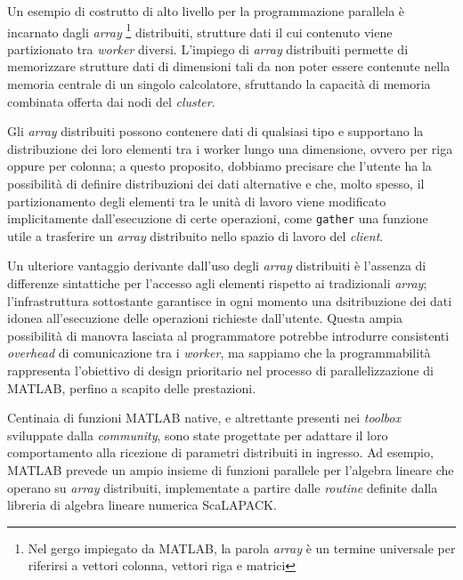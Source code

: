 Un esempio di costrutto di alto livello per la programmazione parallela \`e incarnato dagli \textit{array}
\footnote{Nel gergo impiegato da MATLAB, la parola \textit{array} \`e un termine universale per riferirsi a vettori colonna, vettori riga e matrici} 
distribuiti, strutture dati il cui contenuto viene partizionato tra \textit{worker} diversi.\newline
L'impiego di \textit{array} distribuiti permette di memorizzare strutture dati di dimensioni tali da non poter essere contenute nella memoria centrale di un 
singolo calcolatore, sfruttando la capacit\`a di memoria combinata offerta dai nodi del \textit{cluster}.

Gli \textit{array} distribuiti possono contenere dati di qualsiasi tipo e supportano la distribuzione dei loro elementi tra i worker lungo una dimensione, ovvero 
per riga oppure per colonna; a questo proposito, dobbiamo precisare che l'utente ha la possibilit\`a di definire distribuzioni dei dati alternative e che, 
molto spesso, il partizionamento degli elementi tra le unit\`a di lavoro viene modificato implicitamente dall'esecuzione di certe operazioni, 
come \lstinline|gather| una funzione utile a trasferire un \textit{array} distribuito nello spazio di lavoro del \textit{client}.

Un ulteriore vantaggio derivante dall'uso degli \textit{array} distribuiti \`e l'assenza di differenze sintattiche per l'accesso agli elementi rispetto ai 
tradizionali \textit{array}; l'infrastruttura sottostante garantisce in ogni momento una dsitribuzione dei dati idonea all'esecuzione delle operazioni 
richieste dall'utente.\newline
Questa ampia possibilit\`a di manovra lasciata al programmatore potrebbe introdurre consistenti \textit{overhead} di comunicazione tra i \textit{worker}, 
ma sappiamo che la programmabilit\`a rappresenta l'obiettivo di design prioritario nel processo di parallelizzazione di MATLAB, perfino a scapito delle prestazioni.

Centinaia di funzioni MATLAB native, e altrettante presenti nei \textit{toolbox} sviluppate dalla \textit{community}, sono state progettate per adattare il 
loro comportamento alla ricezione di parametri distribuiti in ingresso.\newline
Ad esempio, MATLAB prevede un ampio insieme di funzioni parallele per l'algebra lineare che operano su \textit{array} distribuiti, implementate a partire dalle \textit{routine} definite dalla libreria di algebra lineare numerica ScaLAPACK.